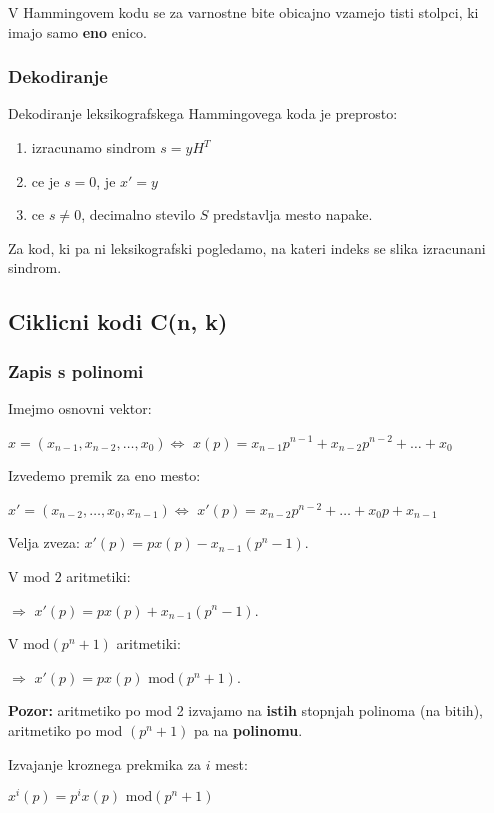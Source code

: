 \documentclass{article}
\begin{document}
\begin{multicols}{4}
 V Hammingovem kodu se za varnostne bite obicajno vzamejo tisti stolpci, ki imajo samo \textbf{eno} enico.

\subsubsection{Dekodiranje}
Dekodiranje leksikografskega Hammingovega koda je preprosto:
\begin{enumerate}
    \item izracunamo sindrom $s = yH^T$
    \item ce je $s = 0$, je $x' = y$
    \item ce $s \neq 0$, decimalno stevilo $S$ predstavlja mesto napake.
\end{enumerate}
Za kod, ki pa ni leksikografski pogledamo, na kateri indeks se slika izracunani sindrom.

\subsection{Ciklicni kodi C(n, k)}

\subsubsection{Zapis s polinomi}
Imejmo osnovni vektor: 
\begin{center}
    $x = (x_{n-1}, x_{n-2}, \dots, x_0) \Leftrightarrow$
    $x(p) = x_{n-1}p^{n-1} + x_{n-2}p^{n-2} + \dots + x_0$ 
\end{center}
Izvedemo premik za eno mesto:
\begin{center}
    $x' = (x_{n-2}, \dots, x_0, x_{n-1}) \Leftrightarrow$
    $x'(p) = x_{n-2}p^{n-2} + \dots + x_0p + x_{n-1}$ 
\end{center}
Velja zveza: $x'(p) = px(p) - x_{n-1}(p^n -1)$.

V mod $2$ aritmetiki:
\begin{center}
    $\Rightarrow$ $x'(p) = px(p) + x_{n-1}(p^n -1)$.
\end{center}

V $\text{mod}(p^n + 1)$ aritmetiki:
\begin{center}
    $\Rightarrow$ $x'(p) = px(p) \text{ mod}(p^n + 1)$.
\end{center}

\textbf{Pozor:} aritmetiko po mod 2 izvajamo na \textbf{istih} stopnjah polinoma (na bitih), aritmetiko
po mod $(p^n + 1)$ pa na \textbf{polinomu}.

Izvajanje kroznega prekmika za $i$ mest:
\begin{center}
    \begin{math}
        x^i(p) = p^i x(p) \text{ mod} (p^n + 1)
    \end{math}
\end{center}


\end{multicols}
\end{document}
